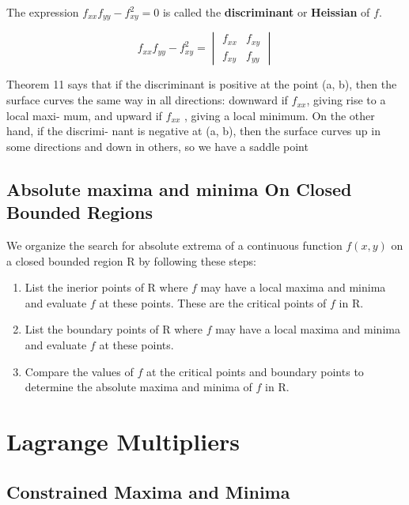 \documentclass[12pt,a4paper,draft]{article}
\begin{document}
The expression \(f_{xx}f_{yy}-f_{xy}^2 = 0\) is called the \textbf{discriminant} or \textbf{Heissian} of \(f\).

\[f_{xx}f_{yy}-f_{xy}^2  = \begin{vmatrix} f_{xx} & f_{xy} \\ f_{xy} & f_{yy} \end{vmatrix}\]

Theorem 11 says that if the discriminant is positive at the point (a, b), then the surface
curves the same way in all directions: downward if \(f_{xx}\), giving rise to a local maxi-
mum, and upward if  \(f_{xx}\) , giving a local minimum. On the other hand, if the discrimi-
nant is negative at (a, b), then the surface curves up in some directions and down in others,
so we have a saddle point

\subsection{Absolute maxima and minima On Closed Bounded Regions}


We organize the search for absolute extrema of a continuous function \(f(x,y)\) on a closed bounded region R by following these steps:

\begin{enumerate}
    \item List the inerior points of R where \(f\) may have a local maxima and minima and evaluate \(f\) at these points. These are the critical points of \(f\) in R.
    \item List the boundary points of R where \(f\) may have a local maxima and minima and evaluate \(f\) at these points. 
    \item Compare the values of \(f\) at the critical points and boundary points to determine the absolute maxima and minima of \(f\) in R.
\end{enumerate}

\section{Lagrange Multipliers}

\subsection{Constrained Maxima and Minima}
\end{document}
